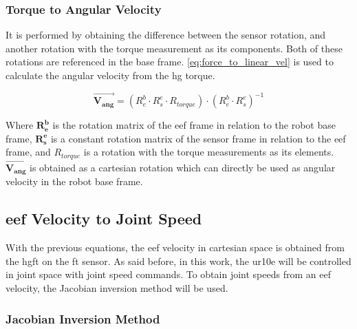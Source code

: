 \subsubsection{Torque to Angular Velocity}


\par It is performed by obtaining the difference between the sensor rotation, and another rotation with the torque measurement as its components. Both of these rotations are referenced in the base frame. \autoref{eq:force_to_linear_vel} is used to calculate the angular velocity from the \ac{hg} torque.

\begin{equation}
    \vec{\mathbf{V_{ang}}} = (R^b_e \cdot R^e_s \cdot R_{torque}) \cdot (R^b_e \cdot R^e_s)^{-1}
    \label{eq:torque_to_angular_vel}
\end{equation}

\noindent Where $\mathbf{R^b_e}$ is the rotation matrix of the \ac{eef} frame in relation to the robot base frame, $\mathbf{R^e_s}$ is a constant rotation matrix of the sensor frame in relation to the \ac{eef} frame, and $R_{torque}$ is a rotation with the torque measurements as its elements. $\vec{\mathbf{V_{ang}}}$ is obtained as a cartesian rotation which can directly be used as angular velocity in the robot base frame.



\subsection{\ac{eef} Velocity to Joint Speed}
\label{ssec:eef_to_js}

\par With the previous equations, the \ac{eef} velocity in cartesian space is obtained from the \ac{hgft} on the \ac{ft} sensor. As said before, in this work, the \ac{ur10e} will be controlled in joint space with joint speed commands. To obtain joint speeds from an \ac{eef} velocity, the Jacobian inversion method will be used.


\subsubsection{Jacobian Inversion Method}


